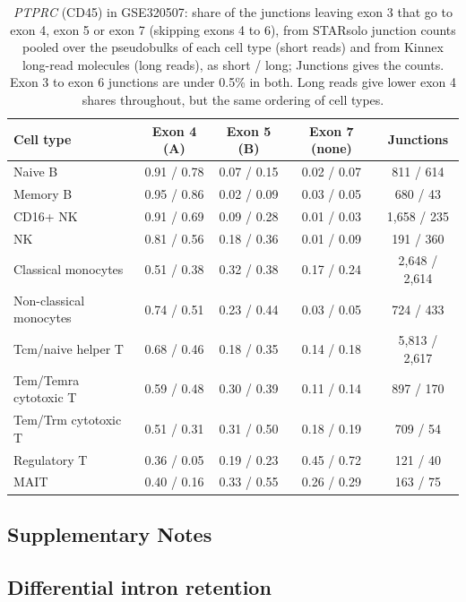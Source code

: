 \documentclass[11pt]{article}
\begin{document}
\begin{table}[ht]
\centering
\small
\begin{tabular}{lcccc}
\toprule
Cell type & Exon 4 (A) & Exon 5 (B) & Exon 7 (none) & Junctions\\
\midrule
Naive B & 0.91 / 0.78 & 0.07 / 0.15 & 0.02 / 0.07 & 811 / 614\\
Memory B & 0.95 / 0.86 & 0.02 / 0.09 & 0.03 / 0.05 & 680 / 43\\
CD16+ NK & 0.91 / 0.69 & 0.09 / 0.28 & 0.01 / 0.03 & 1{,}658 / 235\\
NK & 0.81 / 0.56 & 0.18 / 0.36 & 0.01 / 0.09 & 191 / 360\\
Classical monocytes & 0.51 / 0.38 & 0.32 / 0.38 & 0.17 / 0.24 & 2{,}648 / 2{,}614\\
Non-classical monocytes & 0.74 / 0.51 & 0.23 / 0.44 & 0.03 / 0.05 & 724 / 433\\
Tcm/naive helper T & 0.68 / 0.46 & 0.18 / 0.35 & 0.14 / 0.18 & 5{,}813 / 2{,}617\\
Tem/Temra cytotoxic T & 0.59 / 0.48 & 0.30 / 0.39 & 0.11 / 0.14 & 897 / 170\\
Tem/Trm cytotoxic T & 0.51 / 0.31 & 0.31 / 0.50 & 0.18 / 0.19 & 709 / 54\\
Regulatory T & 0.36 / 0.05 & 0.19 / 0.23 & 0.45 / 0.72 & 121 / 40\\
MAIT & 0.40 / 0.16 & 0.33 / 0.55 & 0.26 / 0.29 & 163 / 75\\
\bottomrule
\end{tabular}
\caption{\emph{PTPRC} (CD45) in GSE320507: share of the junctions leaving exon 3 that go to exon 4, exon 5 or exon 7 (skipping exons 4 to 6), from STARsolo junction counts pooled over the pseudobulks of each cell type (short reads) and from Kinnex long-read molecules (long reads), as short / long; Junctions gives the counts. Exon 3 to exon 6 junctions are under 0.5\% in both. Long reads give lower exon 4 shares throughout, but the same ordering of cell types.}
\label{tab:ptprc}
\end{table}

\clearpage
\subsection*{Supplementary Notes}

\subsection{Differential intron retention}
\label{sec:ir}
\end{document}
